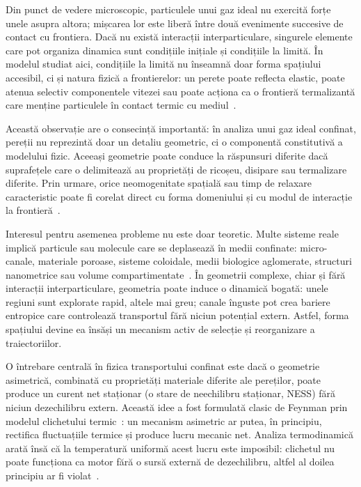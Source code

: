 \documentclass[12pt,openright,twoside]{book}
\begin{document}
Din punct de vedere microscopic, particulele unui gaz ideal nu exercită forțe unele asupra altora; mișcarea lor este liberă între două evenimente succesive de contact cu frontiera. Dacă nu există interacții interparticulare, singurele elemente care pot organiza dinamica sunt condițiile inițiale și condițiile la limită. În modelul studiat aici, condițiile la limită nu înseamnă doar forma spațiului accesibil, ci și natura fizică a frontierelor: un perete poate reflecta elastic, poate atenua selectiv componentele vitezei sau poate acționa ca o frontieră termalizantă care menține particulele în contact termic cu mediul~\cite{cercignani1988}.

Această observație are o consecință importantă: în analiza unui gaz ideal confinat, pereții nu reprezintă doar un detaliu geometric, ci o componentă constitutivă a modelului fizic. Aceeași geometrie poate conduce la răspunsuri diferite dacă suprafețele care o delimitează au proprietăți de ricoșeu, disipare sau termalizare diferite. Prin urmare, orice neomogenitate spațială sau timp de relaxare caracteristic poate fi corelat direct cu forma domeniului și cu modul de interacție la frontieră~\cite{cercignani1988,kogan1969}.

Interesul pentru asemenea probleme nu este doar teoretic. Multe sisteme reale implică particule sau molecule care se deplasează în medii confinate: micro-canale, materiale poroase, sisteme coloidale, medii biologice aglomerate, structuri nanometrice sau volume compartimentate~\cite{squires2005,drescher2011}. În geometrii complexe, chiar și fără interacții interparticulare, geometria poate induce o dinamică bogată: unele regiuni sunt explorate rapid, altele mai greu; canale înguste pot crea bariere entropice care controlează transportul fără niciun potențial extern. Astfel, forma spațiului devine ea însăși un mecanism activ de selecție și reorganizare a traiectoriilor.

O întrebare centrală în fizica transportului confinat este dacă o geometrie asimetrică, combinată cu proprietăți materiale diferite ale pereților, poate produce un curent net staționar (o stare de neechilibru staționar, NESS) fără niciun dezechilibru extern. Această idee a fost formulată clasic de Feynman prin modelul clichetului termic~\cite{feynman1963}: un mecanism asimetric ar putea, în principiu, rectifica fluctuațiile termice și produce lucru mecanic net. Analiza termodinamică arată însă că la temperatură uniformă acest lucru este imposibil: clichetul nu poate funcționa ca motor fără o sursă externă de dezechilibru, altfel al doilea principiu ar fi violat~\cite{feynman1963,parrondo1996,magnasco1993,reimann2002}.
\end{document}
